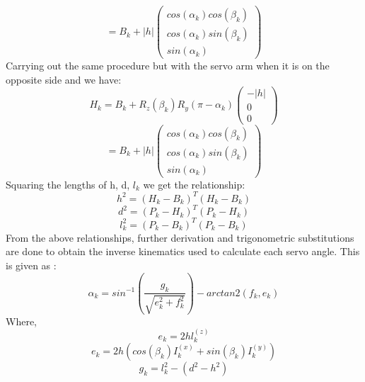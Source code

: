 \begin{equation}
 = B_{k} + |h|\begin{pmatrix}
cos(\alpha_{k})cos(\beta_{k})\\
 cos(\alpha_{k})sin(\beta_{k})\\
  sin(\alpha_{k})
\end{pmatrix}
\label{eq:myeqn2}
\end{equation}
Carrying out the same procedure but with the servo arm when it is on the opposite side and we have:
\begin{equation}
H_{k} = B_{k} + R_{z}(\beta_{k}) R_{y}(\pi -\alpha_{k})\begin{pmatrix}
-|h|\\ 0 \\ 0
\end{pmatrix}
\label{eq:myeqn2}
\end{equation}
\begin{equation}
 = B_{k} + |h|\begin{pmatrix}
cos(\alpha_{k})cos(\beta_{k})\\
 cos(\alpha_{k})sin(\beta_{k})\\
  sin(\alpha_{k})
\end{pmatrix}
\label{eq:myeqn2}
\end{equation}
Squaring the lengths of h, d, $l_{k}$ we get the relationship:
$$h^2 = (H_{k}-B_{k})^{T}(H_{k}-B_{k})$$
$$d^2 = (P_{k}-H_{k})^{T}(P_{k}-H_{k})$$
$$l_{k}^2 = (P_{k}-B_{k})^{T}(P_{k}-B_{k})$$
From the above relationships, further derivation and trigonometric substitutions are done to obtain the inverse kinematics used to calculate each servo angle. This is given as \cite{Eisele_2019}:
\begin{equation}
\alpha_{k} = sin^{-1}(\frac{g_{k}}{\sqrt{e_{k}^2+f_{k}^2}})-arctan2(f_{k}, e_{k})
\end{equation}
Where,
$$e_{k} = 2hl_{k}^{(z)} $$
$$e_{k} = 2h(cos(\beta_{k})I_{k}^{(x)}+sin({\beta_{k}})I_{k}^(y))$$
$$g_{k} = l_{k}^2 - (d^2 - h^2)   $$


